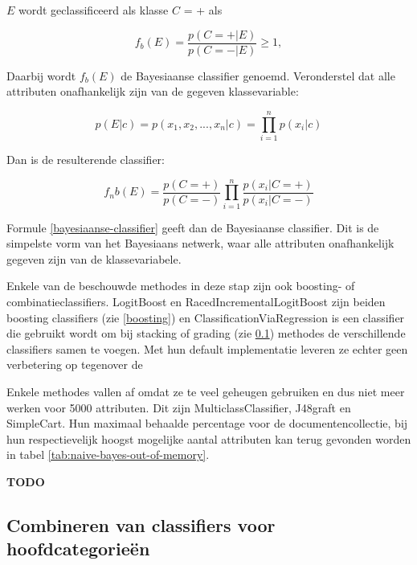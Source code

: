 $E$ wordt geclassificeerd als klasse $C$ = + als

\begin{equation}
f_b(E) = \frac{p(C = +|E)}{p(C = -|E)} \geq 1,
\end{equation}

Daarbij wordt $f_b(E)$ de Bayesiaanse classifier genoemd. Veronderstel dat alle attributen onafhankelijk zijn van de gegeven klassevariable: 

\begin{equation}
p(E|c) = p(x_1,x_2,...,x_n|c) = \prod_{i=1}^{n}p(x_i|c)
\end{equation}

Dan is de resulterende classifier:

\begin{equation}\label{bayesiaanse-classifier}
f_nb(E) = \frac{p(C = +)}{p(C = -)}\prod_{i=1}^{n}\frac{p(x_i|C = +)}{p(x_i|C = -)}
\end{equation}

Formule \ref{bayesiaanse-classifier} geeft dan de Bayesiaanse classifier. Dit is de simpelste vorm van het Bayesiaans netwerk, waar alle attributen onafhankelijk gegeven zijn van de klassevariabele. 



Enkele van de beschouwde methodes in deze stap zijn ook boosting- of combinatieclassifiers. LogitBoost en RacedIncrementalLogitBoost zijn beiden boosting classifiers (zie \ref{boosting}) en ClassificationViaRegression is een classifier die gebruikt wordt om bij stacking of grading (zie \ref{combineren-classifiers}) methodes de verschillende classifiers samen te voegen. Met hun default implementatie leveren ze echter geen verbetering op tegenover de 

Enkele methodes vallen af omdat ze te veel geheugen gebruiken en dus niet meer werken voor 5000 attributen. Dit zijn MulticlassClassifier, J48graft en SimpleCart. Hun maximaal behaalde percentage voor de documentencollectie, bij hun respectievelijk hoogst mogelijke aantal attributen kan terug gevonden worden in tabel \ref{tab:naive-bayes-out-of-memory}.

\textbf{TODO}



\subsection{Combineren van classifiers voor hoofdcategorie\"en}
\label{combineren-classifiers}
